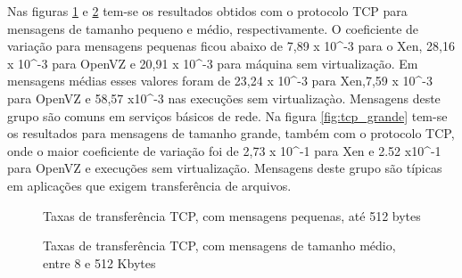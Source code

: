 \documentclass[12pt]{article}
\begin{document}
Nas figuras \ref{fig:tcp_peq} e \ref{fig:tcp_med} tem-se os resultados obtidos com o protocolo TCP para mensagens de tamanho pequeno e médio, respectivamente. O coeficiente de variação para mensagens pequenas ficou abaixo de 7,89 x 10^{-3} para o Xen, 28,16 x 10^{-3} para OpenVZ e 20,91 x 10^{-3} para máquina sem virtualização. Em mensagens médias esses valores foram de 23,24 x 10^{-3} para Xen,7,59 x 10^{-3} para OpenVZ e 58,57 x10^{-3} nas execuções sem virtualizaçào. Mensagens deste grupo são comuns em serviços básicos de rede. Na figura \ref{fig:tcp_grande} tem-se os resultados para mensagens de tamanho grande, também com o protocolo TCP, onde o maior coeficiente de variação foi de 2,73 x 10^{-1} para Xen e 2.52 x10^{-1} para OpenVZ e execuções sem virtualização. Mensagens deste grupo são típicas em aplicações que exigem transferência de arquivos.

\begin{figure}[!htb]
\centering
{}
\caption{Taxas de transferência TCP, com mensagens pequenas, até 512 bytes}
\label{fig:tcp_peq}
\end{figure}

\begin{figure}[!htb]
\centering
{}
\caption{Taxas de transferência TCP, com mensagens de tamanho médio, entre 8 e 512 Kbytes}
\label{fig:tcp_med}
\end{figure}
\end{document}
